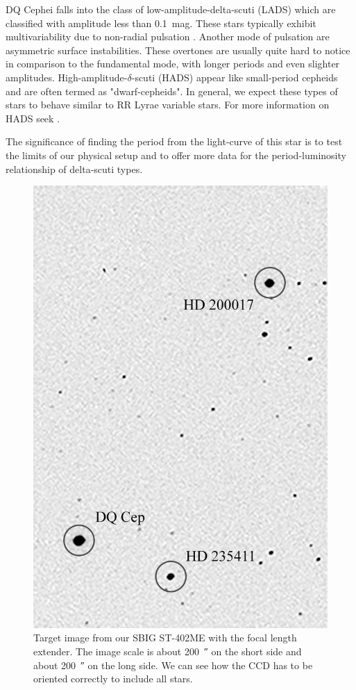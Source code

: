 \documentclass[%
aip,
jmp,
reprint,
floatfix,
nofootinbib
]{revtex4-1}
\begin{document}
	DQ Cephei falls into the class of low-amplitude-delta-scuti (LADS) which are classified with amplitude less than \SI{0.1}{mag}. These stars typically exhibit multivariability due to non-radial pulsation \citep{1937LicOB..18...77F, 1938ApJ....87..133S}. Another mode of pulsation are asymmetric surface instabilities. These overtones are usually quite hard to notice in comparison to the fundamental mode, with longer periods and even slighter amplitudes. High-amplitude-$\delta$-scuti (HADS) appear like small-period cepheids and are often termed as "dwarf-cepheids". In general, we expect these types of stars to behave similar to RR Lyrae variable stars. For more information on HADS seek \citet{1997PASP..109.1221M}. 
	
	The significance of finding the period from the light-curve of this star is to test the limits of our physical setup and to offer more data for the period-luminosity relationship of delta-scuti types.
	
	\begin{table}[t]
		\centering
		\label{tab:info}
		
	\end{table}

	\begin{figure}
		\centering
		\includegraphics[width=.8\linewidth]{figs/map.png}
		\caption{Target image from our SBIG ST-402ME with the focal length extender. The image scale is about \SI{200}{\arcsecond} on the short side and about \SI{200}{\arcsecond} on the long side. We can see how the CCD has to be oriented correctly to include all stars.}
		\label{fig:map}
	\end{figure}
	
\end{document}
